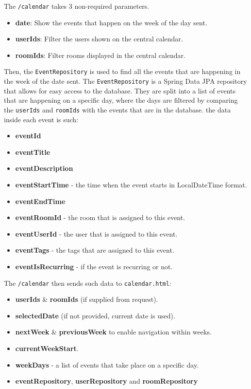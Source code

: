 The \texttt{/calendar} takes 3 non-required parameters.
\begin{itemize}
    \item \textbf{date}: Show the events that happen on the week of the day sent.
    \item \textbf{userIds}: Filter the users shown on the central calendar.
    \item \textbf{roomIds}: Filter rooms displayed in the central calendar.
\end{itemize}
Then, the \texttt{EventRepository} is used to find all the events that are happening in the week of the date sent.
The \texttt{EventRepository} is a Spring Data JPA repository that allows for easy access to the database.
They are split into a list of events that are happening on a specific day, where the days are filtered by comparing the \texttt{userIds} and \texttt{roomIds} with the events that are in the database.
the data inside each event is such:
\begin{itemize}
    \item \textbf{eventId}
    \item \textbf{eventTitle}
    \item \textbf{eventDescription}
    \item \textbf{eventStartTime} - the time when the event starts in LocalDateTime format.
    \item \textbf{eventEndTime}
    \item \textbf{eventRoomId} - the room that is assigned to this event.
    \item \textbf{eventUserId} - the user that is assigned to this event.
    \item \textbf{eventTags} - the tags that are assigned to this event.
    \item \textbf{eventIsRecurring} - if the event is recurring or not.
\end{itemize}
The \texttt{/calendar} then sends such data to \texttt{calendar.html}:
\begin{itemize}
    \item \textbf{userIds} \& \textbf{roomIds} (if supplied from request).
    \item \textbf{selectedDate} (if not provided, current date is used).
    \item \textbf{nextWeek} \& \textbf{previousWeek} to enable navigation within weeks.
    \item \textbf{currentWeekStart}.
    \item \textbf{weekDays} - a list of events that take place on a specific day.
    \item \textbf{eventRepository}, \textbf{userRepository} and \textbf{roomRepository}
\end{itemize}

